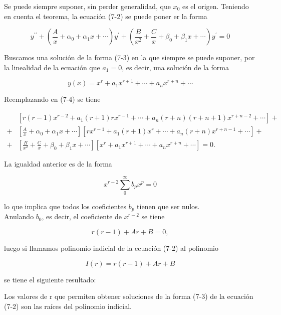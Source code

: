 \documentclass[10pt]{article}
\theoremstyle{plain}
\theoremstyle{definition}
\theoremstyle{remark}
\begin{document}
Se puede siempre suponer, sin perder generalidad, que $x_{0}$ es el origen. Teniendo en cuenta el teorema, la ecuación (7-2) se puede poner er la forma


\begin{equation*}
y^{\prime \prime}+\left(\frac{A}{x}+\alpha_{0}+\alpha_{1} x+\cdots\right) y^{\prime}+\left(\frac{B}{x^{2}}+\frac{C}{x}+\beta_{0}+\beta_{1} x+\cdots\right) y^{\prime}=0 \tag{$7\cdot4$}
\end{equation*}


Buscamos una solución de la forma (7-3) en la que siempre se puede suponer, por la linealidad de la ecuación que $a_{1}=0$, es decir, una solución de la forma


\begin{equation*}
y(x)=x^{r}+a_{1} x^{r+1}+\cdots+a_{n} x^{r+n}+\cdots \tag{7-5}
\end{equation*}


Reemplazando en (7-4) se tiene

$$
\begin{aligned}
& {\left[r(r-1) x^{r-2}+a_{1}(r+1) r x^{r-1}+\cdots+a_{n}(r+n)(r+n+1) x^{r+n-2}+\cdots\right]+} \\
+ & {\left[\frac{A}{x}+\alpha_{0}+\alpha_{1} x+\cdots\right]\left[r x^{r-1}+a_{1}(r+1) x^{r}+\cdots+a_{n}(r+n) x^{r+n-1}+\cdots\right]+} \\
+ & {\left[\frac{B}{x^{2}}+\frac{C}{x}+\beta_{0}+\beta_{1} x+\cdots\right]\left[x^{r}+a_{1} x^{r+1}+\cdots+a_{n} x^{r+n}+\cdots\right]=0 . }
\end{aligned}
$$

La igualdad anterior es de la forma


\begin{equation*}
x^{r-2} \sum_{0}^{\infty} b_{p} x^{p}=0 \tag{7-6}
\end{equation*}


lo que implica que todos los coeficientes $b_{p}$ tienen que ser nulos.\\
Anulando $b_{0}$, es decir, el coeficiente de $x^{r-2}$ se tiene


\begin{equation*}
r(r-1)+A r+B=0, \tag{7-7}
\end{equation*}


luego si llamamos polinomio indicial de la ecuación (7-2) al polinomio

$$
I(r)=r(r-1)+A r+B
$$

se tiene el siguiente resultado:

Los valores de r que permiten obtener soluciones de la forma (7-3) de la ecuación (7-2) son las raíces del polinomio indicial.
\end{document}
